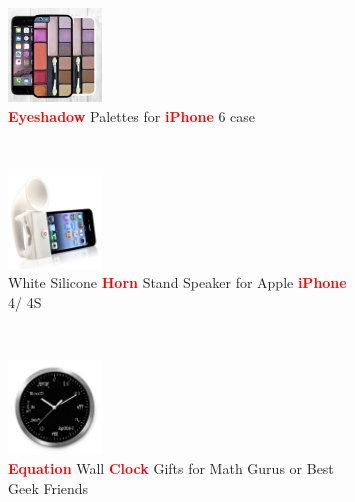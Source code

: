 \documentclass{article} %
\begin{document}
\begin{figure}
        \begin{subfigure}[b]{0.25\textwidth}
        	        \centering
                \includegraphics[width=25mm]{figures/eyeshadow-iphone-case.jpg}
                \caption{\textcolor{red}{{\bf Eyeshadow}} Palettes for \textcolor{red}{{\bf iPhone}} 6 case}
                \label{fig:eyeshadow-iphone-case}
        \end{subfigure}
              ~ %
        \begin{subfigure}[b]{0.3\textwidth}
                \includegraphics[width=25mm]{figures/horn-iphone-speaker.jpg}
                \caption{White Silicone \textcolor{red}{{\bf Horn}} Stand Speaker for Apple \textcolor{red}{{\bf iPhone}} 4/ 4S}
                \label{fig:zeppelin-speaker}
        \end{subfigure}
       ~ %
        \begin{subfigure}[b]{0.3\textwidth}
                \includegraphics[width=25mm]{figures/geeky-clock}
                \caption{\textcolor{red}{{\bf Equation}} Wall \textcolor{red}{{\bf Clock}} Gifts for Math Gurus or Best Geek Friends}
                \label{fig:geeky-clock}
        \end{subfigure}
       \caption{}\label{fig:ebay-products}
\end{figure}
\end{document}
